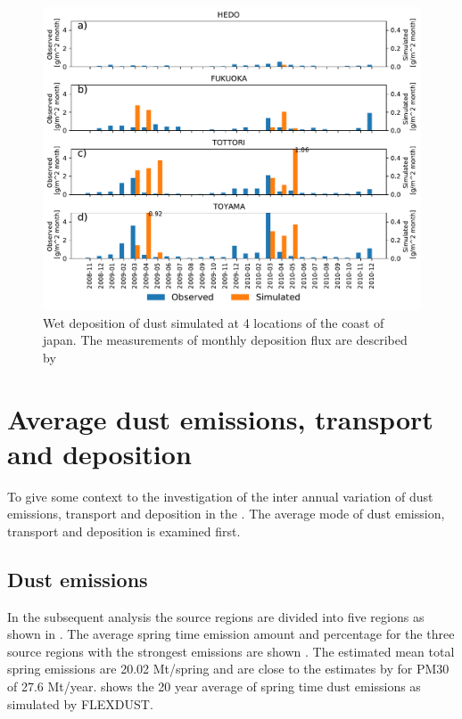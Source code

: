 \begin{figure}[hptb]
    \centering
    \includegraphics[width=\textwidth]{texfiles/figs/monthly_accumulated_wet_depostion_japan.pdf}
    \caption{Wet deposition of dust simulated at 4 locations of the coast of japan. The measurements of monthly deposition flux are described by \textcite{osada2014wet}}
    \label{fig:model_eval_wet_deposition}
\end{figure}

\section{Average dust emissions, transport and deposition}\label{sec:result_average}
To give some context to the investigation of the inter annual variation of dust emissions, transport and deposition in the . The average mode of dust emission, transport and deposition is examined first. 
\subsection{Dust emissions}
In the subsequent analysis the source regions are divided into five regions as shown in . The average spring time emission amount and percentage for the three source regions with the strongest emissions are shown . The estimated mean total spring emissions are 20.02 Mt/spring and are close to the estimates by \textcite{xuan2004identification} for PM30 of 27.6 Mt/year. 
 shows the 20 year average of spring time dust emissions as simulated by FLEXDUST.


